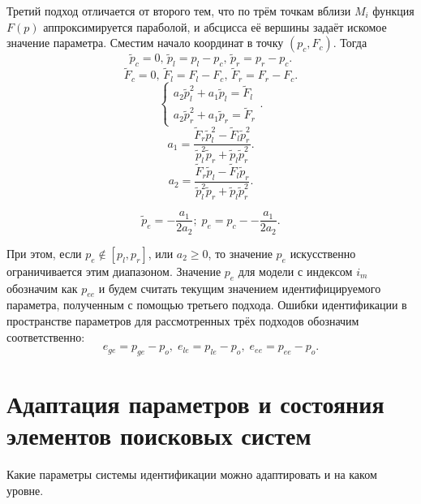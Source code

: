 
Третий подход отличается от второго тем, что по трём точкам вблизи  $M_{i}$
функция $F(p)$ аппроксимируется параболой, и абсцисса её вершины задаёт искомое
значение параметра. Сместим начало координат в точку
$ ( p_c, F_c ) $. Тогда
%
\[
  \tilde{p}_c = 0, \,
  \tilde{p}_l = p_l - p_c, \,
  \tilde{p}_r = p_r - p_c.
\]
%
\[
  \tilde{F}_c = 0, \,
  \tilde{F}_l = F_l - F_c, \,
  \tilde{F}_r = F_r - F_c.
\]
%
\[
  \left\{
    \begin{array}{l}
      a_2 \tilde{p}_l^2 + a_1 \tilde{p}_l  = \tilde{F}_l
      \\
      a_2 \tilde{p}_r^2 + a_1 \tilde{p}_r  = \tilde{F}_r
    \end{array}
  \right. .
\]
%
\[
  a_1 = \frac{\tilde{F}_r \tilde{p}_l^2 - \tilde{F}_l \tilde{p}_r^2 }
             { \tilde{p}_l^2 \tilde{p}_r  + \tilde{p}_l \tilde{p}_r^2 }.
\]
%
\[
  a_2 = \frac{\tilde{F}_r \tilde{p}_l - \tilde{F}_l \tilde{p}_r }
             { \tilde{p}_l^2 \tilde{p}_r  + \tilde{p}_l \tilde{p}_r^2 }.
\]

\begin{equation}
  \tilde{p}_e = - \frac{a_1}{2 a_2};
  \;
  p_e = p_c -- \frac{a_1}{2 a_2}.
  \label{atu:eq:p_e}
\end{equation}


При этом, если
$ p_e \notin [ p_l, p_r ] $, или $ a_2 \ge 0 $, то значение $p_e$ искусственно
ограничивается этим диапазоном. Значение $p_e$ для модели с индексом
$i_m$ обозначим как $p_{ee}$ и будем считать
текущим значением идентифицируемого параметра, полученным с помощью
третьего подхода. Ошибки идентификации в пространстве параметров
для рассмотренных трёх подходов обозначим соответственно:
%
\begin{equation}
  e_{ge} = p_{ge} - p_o, \;
  e_{le} = p_{le} - p_o, \;
  e_{ee} = p_{ee} - p_o.
  \label{atu:eq:e_xx}
\end{equation}







\section{Адаптация параметров и состояния элементов поисковых систем}  %

Какие параметры системы идентификации можно адаптировать
и на каком уровне.


